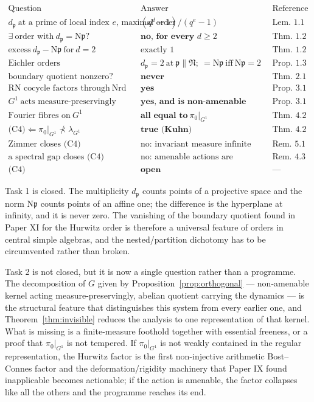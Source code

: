 \documentclass[11pt]{amsart}
\numberwithin{equation}{section}
\theoremstyle{definition}
\theoremstyle{remark}
\newcommand{\pp}{\mathfrak{p}}
\newcommand{\Ns}{\mathrm{N}}
\newcommand{\Nrd}{\operatorname{Nrd}}
\begin{document}
\[
\begin{array}{lll}
\text{Question} & \text{Answer} & \text{Reference}\\\hline
d_\pp\ \text{at a prime of local index }e\text{, maximal order} & (q^d-1)/(q^e-1) & \text{Lem.~1.1}\\
\exists\ \text{order with}\ d_\pp=\Ns\pp? & \textbf{no, for every }d\ge2 & \text{Thm.~1.2}\\
\text{excess}\ d_\pp-\Ns\pp\ \text{for}\ d=2 & \text{exactly }1 & \text{Thm.~1.2}\\
\text{Eichler orders} & d_\pp=2\ \text{at}\ \pp\|\mathfrak N;\ =\Ns\pp\ \text{iff}\ \Ns\pp=2 & \text{Prop.~1.3}\\
\text{boundary quotient nonzero?} & \textbf{never} & \text{Thm.~2.1}\\
\text{RN cocycle factors through}\ \Nrd & \textbf{yes} & \text{Prop.~3.1}\\
G^1\ \text{acts measure-preservingly} & \textbf{yes, and is non-amenable} & \text{Prop.~3.1}\\
\text{Fourier fibres on}\ G^1 & \textbf{all equal to}\ \pi_0|_{G^1} & \text{Thm.~4.2}\\
\text{(C4)}\Leftarrow\pi_0|_{G^1}\not\prec\lambda_{G^1} & \textbf{true (Kuhn)} & \text{Thm.~4.2}\\
\text{Zimmer closes (C4)} & \text{no: invariant measure infinite} & \text{Rem.~5.1}\\
\text{a spectral gap closes (C4)} & \text{no: amenable actions are tempered} & \text{Rem.~4.3}\\
\text{(C4)} & \textbf{open} & \text{---}
\end{array}
\]

Task 1 is closed. The multiplicity $d_\pp$ counts points of a projective space and the norm
$\Ns\pp$ counts points of an affine one; the difference is the hyperplane at infinity, and it
is never zero. The vanishing of the boundary quotient found in Paper XI for the Hurwitz
order is therefore a universal feature of orders in central simple algebras, and
the nested/partition dichotomy has to be circumvented rather than broken.

Task 2 is not closed, but it is now a single question rather than a programme. The
decomposition of $G$ given by Proposition~\ref{prop:orthogonal} --- non-amenable kernel acting
measure-preservingly, abelian quotient carrying the dynamics --- is the structural feature
that distinguishes this system from every earlier one, and Theorem~\ref{thm:invisible} reduces
the analysis to one representation of that kernel. What is missing is a finite-measure
foothold together with essential freeness, or a proof that $\pi_0|_{G^1}$ is not tempered. If
$\pi_0|_{G^1}$ is not weakly contained in the regular representation, the Hurwitz factor is
the first non-injective arithmetic Bost--Connes factor and the deformation/rigidity machinery
that Paper IX found inapplicable becomes actionable; if the action is amenable, the factor
collapses like all the others and the programme reaches its end.
\end{document}
